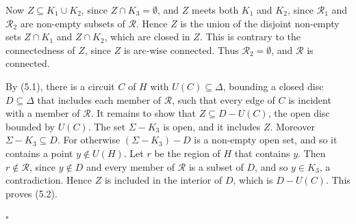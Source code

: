 {Now $Z \subseteq K_1 \cup K_2$, since $Z \cap K_3 = \emptyset$, and $Z$ meets both $K_1$ and $K_2$, since $\mathscr{R}_1$ and $\mathscr{R}_2$ are non-empty subsets of $\mathscr{R}$. Hence $Z$ is the union of the disjoint non-empty sets $Z \cap K_1$ and $Z \cap K_2$, which are closed in $Z$. This is contrary to the connectedness of $Z$, since $Z$ is arc-wise connected. Thus $\mathscr{R}_2 = \emptyset$, and $\mathscr{R}$ is connected.

By (5.1), there is a circuit $C$ of $H$ with $U(C) \subseteq \Delta$, bounding a closed disc $D \subseteq \Delta$ that includes each member of $\mathscr{R}$, such that every edge of $C$ is incident with a member of $\mathscr{R}$. It remains to show that $Z \subseteq D - U(C)$, the open disc bounded by $U(C)$. The set $\Sigma - K_3$ is open, and it includes $Z$. Moreover $\Sigma - K_3 \subseteq D$. For otherwise $(\Sigma - K_3) - D$ is a non-empty open set, and so it contains a point $y \notin U(H)$. Let $r$ be the region of $H$ that contains $y$. Then $r \notin \mathscr{R}$, since $y \notin D$ and every member of $\mathscr{R}$ is a subset of $D$, and so $y \in K_3$, a contradiction. Hence $Z$ is included in the interior of $D$, which is $D - U(C)$. This proves (5.2).} $\square$
